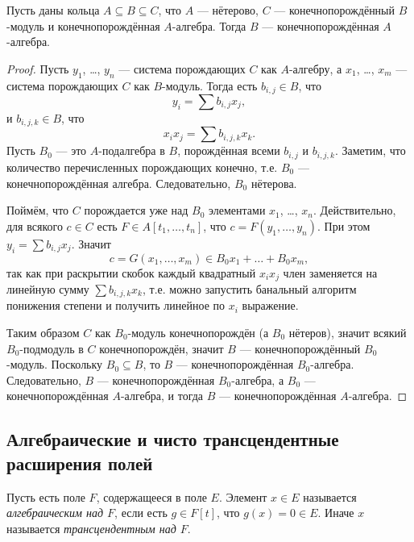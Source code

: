\documentclass[12pt,a4paper]{article}
\begin{document}
    \begin{lemma}\label{horrible-lemma}
        Пусть даны кольца $A \subseteq B \subseteq C$, что $A$ --- нётерово, $C$ --- конечнопорождённый $B$-модуль и конечнопорождённая $A$-алгебра. Тогда $B$ --- конечнопорождённая $A$-алгебра.
    \end{lemma}

    \begin{proof}
        Пусть $y_1$, \dots, $y_n$ --- система порождающих $C$ как $A$-алгебру, а $x_1$, \dots, $x_m$ --- система порождающих $C$ как $B$-модуль. Тогда есть $b_{i, j} \in B$, что
        \[y_i = \sum b_{i, j} x_j,\]
        и $b_{i, j, k} \in B$, что
        \[x_i x_j = \sum b_{i, j, k} x_k.\]
        Пусть $B_0$ --- это $A$-подалгебра в $B$, порождённая всеми $b_{i, j}$ и $b_{i, j, k}$. Заметим, что количество перечисленных порождающих конечно, т.е. $B_0$ --- конечнопорождённая алгебра. Следовательно, $B_0$ нётерова.

        Поймём, что $C$ порождается уже над $B_0$ элементами $x_1$, \dots, $x_n$. Действительно, для всякого $c \in C$ есть $F \in A[t_1, \dots, t_n]$, что $c = F(y_1, \dots, y_n)$. При этом $y_i = \sum b_{i, j} x_j$. Значит
        \[c = G(x_1, \dots, x_m) \in B_0 x_1 + \dots + B_0 x_m,\]
        так как при раскрытии скобок каждый квадратный $x_i x_j$ член заменяется на линейную сумму $\sum b_{i, j, k} x_k$, т.е. можно запустить банальный алгоритм понижения степени и получить линейное по $x_i$ выражение.

        Таким образом $C$ как $B_0$-модуль конечнопорождён (а $B_0$ нётеров), значит всякий $B_0$-подмодуль в $C$ конечнопорождён, значит $B$ --- конечнопорождённый $B_0$-модуль. Поскольку $B_0 \subseteq B$, то $B$ --- конечнопорождённая $B_0$-алгебра. Следовательно, $B$ --- конечнопорождённая $B_0$-алгебра, а $B_0$ --- конечнопорождённая $A$-алгебра, и тогда $B$ --- конечнопорождённая $A$-алгебра.
    \end{proof}

    \subsection{Алгебраические и чисто трансцендентные расширения полей}

    \begin{definition}
        Пусть есть поле $F$, содержащееся в поле $E$. Элемент $x \in E$ называется \emph{алгебраическим над $F$}, если есть $g \in F[t]$, что $g(x) = 0 \in E$. Иначе $x$ называется \emph{трансцендентным над $F$}.
    \end{definition}
\end{document}
